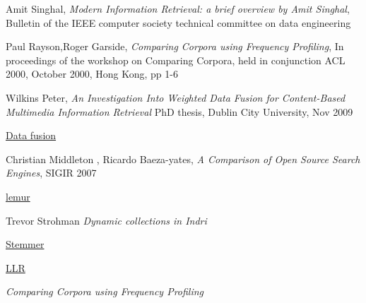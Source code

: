 \documentclass{article}
\begin{document}
\begin{thebibliography}{99}
			Amit Singhal,
			\emph{Modern Information Retrieval: a brief overview by Amit Singhal},
			Bulletin of the IEEE computer society technical committee on data engineering


			Paul Rayson,Roger Garside,
			\emph{Comparing Corpora using Frequency Profiling},
			In proceedings of the workshop on Comparing Corpora, held in conjunction ACL 2000,
			October 2000, Hong Kong,
			pp 1-6

			Wilkins Peter,
			\emph{An Investigation Into Weighted Data Fusion for Content-Based Multimedia Information Retrieval}
			 PhD thesis, Dublin City University,
			 Nov 2009

			\href{http://en.wikipedia.org/wiki/Data_fusion}{Data fusion}


			Christian Middleton , Ricardo Baeza-yates,
			\emph{A Comparison of Open Source Search Engines},
			SIGIR 2007

			\href{http://sourceforge.net/apps/trac/lemur/wiki/Indri}{lemur}

			 Trevor Strohman
			\emph{Dynamic collections in Indri}

			\href{http://snowball.tartarus.org/}{Stemmer}

			\href{http://en.wikipedia.org/wiki/Log-likelihood_ratio}{LLR}

			\emph{Comparing Corpora using Frequency Profiling}

		\end{thebibliography}
\end{document}
